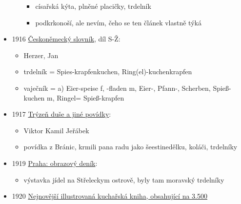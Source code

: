 \begin{itemize}
\begin{itemize}
    \begin{itemize}
    \tightlist
    \item
      císařská kýta, plněné placičky, trdelník
    \item
      podkrkonoší, ale nevím, čeho se ten článek vlastně týká
    \end{itemize}
  \end{itemize}
\item
  1916
  \href{https://ceskadigitalniknihovna.cz/uuid/uuid:57d4bfd0-7b1f-11e3-a80c-005056825209}{Českoněmecký
  slovník}, díl S-Ž:

  \begin{itemize}
  \tightlist
  \item
    Herzer, Jan
  \item
    trdelník = Spies-krapfen\textbar kuchen,
    Ring(el)-kuchen\textbar krapfen
  \item
    vaječník = a) Eier-speise f, -fladen m, Eier-, Pfann-, Scherben,
    Spieß-kuchen m, Ringel= Spieß-krapfen
  \end{itemize}
\item
  1917
  \href{https://ceskadigitalniknihovna.cz/view/uuid:bc7a2eb0-944f-11e6-baa5-005056827e51?page=uuid\%3A1fdf0630-a5f1-11e6-8bf1-001018b5eb5c&fulltext=trdeln\%C3\%ADk\%20OR\%20trdeln\%C3\%ADky\%20OR\%20trdeln\%C3\%ADk\%C5\%AF&source=mzk}{Trýzeň
  duše a jiné povídky}:

  \begin{itemize}
  \tightlist
  \item
    Viktor Kamil Jeřábek
  \item
    povídka z Bránic, krmili pana radu jako šeestinedělku, koláči,
    trdelníky
  \end{itemize}
\item
  1919
  \href{https://ceskadigitalniknihovna.cz/view/uuid:14e7b8a0-0fe2-11ee-8c4d-5ef3fc9bb22f?page=uuid\%3A9b6bf140-0ff9-11ee-b46c-5ef3fcdaa9a7&fulltext=trdeln\%C3\%ADk\%20OR\%20trdeln\%C3\%ADky\%20OR\%20trdeln\%C3\%ADk\%C5\%AF&source=nkp}{Praha:
  obrazový deník}:

  \begin{itemize}
  \tightlist
  \item
    výstavka jídel na Střeleckym ostrově, byly tam moravský trdelníky
  \end{itemize}
\item
  1920
  \href{https://ndk.cz/uuid/uuid:d08ced10-7b32-11eb-9f97-005056827e51}{Nejnovější
  illustrovaná kuchařská kniha, obsahující na 3.500 }


\end{itemize}
